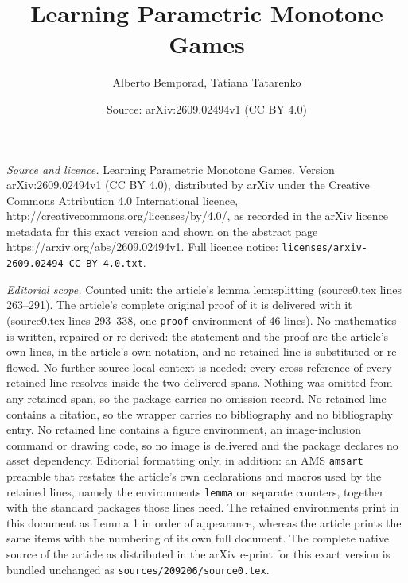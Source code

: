 \documentclass[10pt,a4paper]{amsart}
\title{Learning Parametric Monotone Games}
\author{Alberto Bemporad, Tatiana Tatarenko}
\date{Source: arXiv:2609.02494v1 (CC BY 4.0)}
\begin{document}
\maketitle

\noindent\emph{Source and licence.} Learning Parametric Monotone Games. Version arXiv:2609.02494v1 (CC BY 4.0), distributed by arXiv under the Creative Commons Attribution 4.0 International licence, http://creativecommons.org/licenses/by/4.0/, as recorded in the arXiv licence metadata for this exact version and shown on the abstract page https://arxiv.org/abs/2609.02494v1. Full licence notice: \texttt{licenses/arxiv-2609.02494-CC-BY-4.0.txt}.\par\smallskip

\noindent\textit{Editorial scope.} Counted unit: the article's lemma lem:splitting (source0.tex lines 263--291). The article's complete original proof of it is delivered with it (source0.tex lines 293--338, one \texttt{proof} environment of 46 lines). No mathematics is written, repaired or re-derived: the statement and the proof are the article's own lines, in the article's own notation, and no retained line is substituted or re-flowed.  No further source-local context is needed: every cross-reference of every retained line resolves inside the two delivered spans.  Nothing was omitted from any retained span, so the package carries no omission record.  No retained line contains a citation, so the wrapper carries no bibliography and no bibliography entry.  No retained line contains a figure environment, an image-inclusion command or drawing code, so no image is delivered and the package declares no asset dependency.  Editorial formatting only, in addition: an AMS \texttt{amsart} preamble that restates the article's own declarations and macros used by the retained lines, namely the environments \texttt{lemma} on separate counters, together with the standard packages those lines need.  The retained environments print in this document as Lemma 1 in order of appearance, whereas the article prints the same items with the numbering of its own full document.  The complete native source of the article as distributed in the arXiv e-print for this exact version is bundled unchanged as \texttt{sources/209206/source0.tex}.
\end{document}

